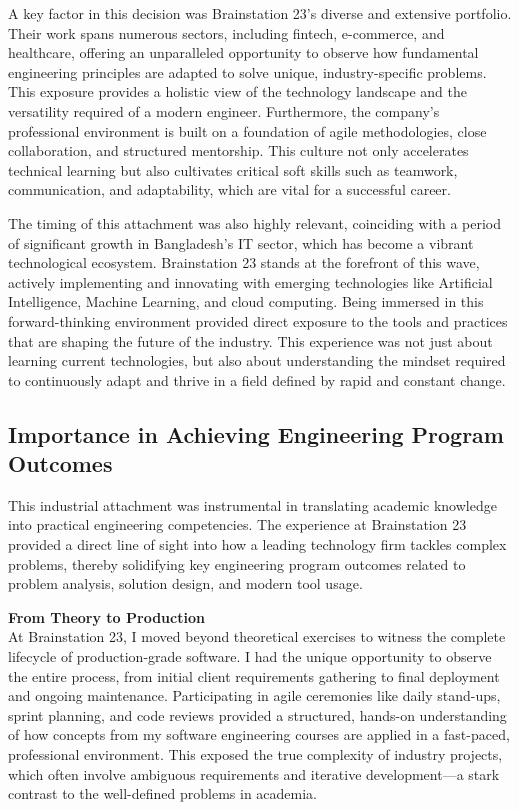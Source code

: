 \documentclass[12pt,a4paper]{article}
\begin{document}
A key factor in this decision was Brainstation 23’s diverse and extensive portfolio. Their work spans numerous sectors, including fintech, e-commerce, and healthcare, offering an unparalleled opportunity to observe how fundamental engineering principles are adapted to solve unique, industry-specific problems. This exposure provides a holistic view of the technology landscape and the versatility required of a modern engineer. Furthermore, the company's professional environment is built on a foundation of agile methodologies, close collaboration, and structured mentorship. This culture not only accelerates technical learning but also cultivates critical soft skills such as teamwork, communication, and adaptability, which are vital for a successful career.

The timing of this attachment was also highly relevant, coinciding with a period of significant growth in Bangladesh’s IT sector, which has become a vibrant technological ecosystem. Brainstation 23 stands at the forefront of this wave, actively implementing and innovating with emerging technologies like Artificial Intelligence, Machine Learning, and cloud computing. Being immersed in this forward-thinking environment provided direct exposure to the tools and practices that are shaping the future of the industry. This experience was not just about learning current technologies, but also about understanding the mindset required to continuously adapt and thrive in a field defined by rapid and constant change.

\subsection{Importance in Achieving Engineering Program Outcomes}
This industrial attachment was instrumental in translating academic knowledge into practical engineering competencies. The experience at Brainstation 23 provided a direct line of sight into how a leading technology firm tackles complex problems, thereby solidifying key engineering program outcomes related to problem analysis, solution design, and modern tool usage.

\textbf{From Theory to Production}\\
At Brainstation 23, I moved beyond theoretical exercises to witness the complete lifecycle of production-grade software. I had the unique opportunity to observe the entire process, from initial client requirements gathering to final deployment and ongoing maintenance. Participating in agile ceremonies like daily stand-ups, sprint planning, and code reviews provided a structured, hands-on understanding of how concepts from my software engineering courses are applied in a fast-paced, professional environment. This exposed the true complexity of industry projects, which often involve ambiguous requirements and iterative development—a stark contrast to the well-defined problems in academia.
\end{document}
